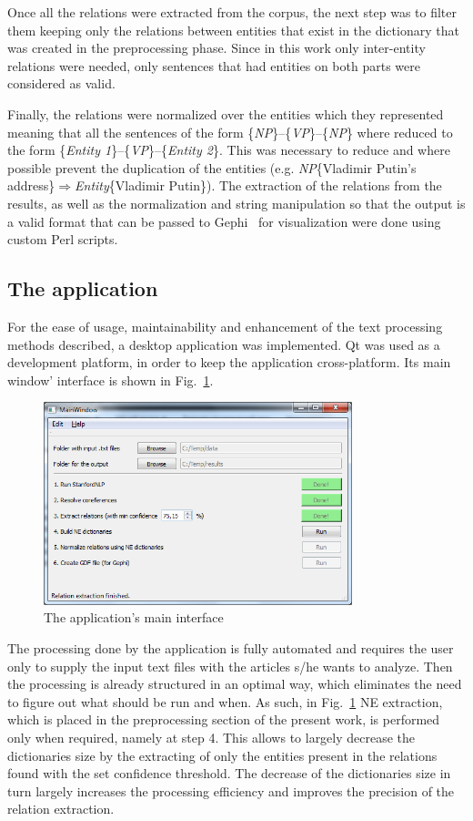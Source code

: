 \documentclass[]{article}
\begin{document}
Once all the relations were extracted from the corpus, the next step was to filter them keeping only the relations between entities that exist in the dictionary that was created in the preprocessing phase. Since in this work only inter-entity relations were needed, only sentences that had entities on both parts were considered as valid. 

Finally, the relations were normalized over the entities which they represented meaning that all the sentences of the form \{\textit{NP}\}--\{\textit{VP}\}--\{\textit{NP}\} where reduced to the form \{\textit{Entity 1}\}--\{\textit{VP}\}--\{\textit{Entity 2}\}. This was necessary to reduce and where possible prevent the duplication of the entities (e.g. \textit{NP}\{Vladimir Putin's address\}$\Rightarrow$\textit{Entity}\{Vladimir Putin\}). The extraction of the relations from the results, as well as the normalization and string manipulation so that the output is a valid format that can be passed to Gephi~\cite{gephi} for visualization were done using custom Perl scripts.
%
\subsection{The application}
%
For the ease of usage, maintainability and enhancement of the text processing methods described, a desktop application was implemented. Qt was used as a development platform, in order to keep the application cross-platform. Its main window' interface is shown in Fig.~\ref{Application}.
\begin{figure}[htbp]
  \centering
    \includegraphics[width=0.8\textwidth]{images/Application}
    \caption{The application's main interface}
  \label{Application}
\end{figure}

The processing done by the application is fully automated and requires the user only to supply the input text files with the articles s/he wants to analyze. Then the processing is already structured in an optimal way, which eliminates the need to figure out what should be run and when. As such, in Fig.~\ref{Application} NE extraction, which is placed in the preprocessing section of the present work, is performed only when required, namely at step 4. This allows to largely decrease the dictionaries size by the extracting of only the entities present in the relations found with the set confidence threshold. The decrease of the dictionaries size in turn largely increases the processing efficiency and improves the precision of the relation extraction.
\end{document}
